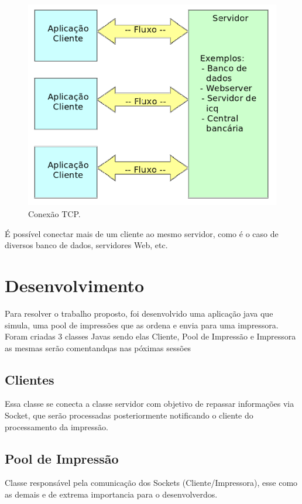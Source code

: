 \documentclass[12pt]{article}
\begin{document}
\begin{figure}[H]
	\centering
	\includegraphics[scale=0.14]{imagens/fluxo.png}
	\caption{Conexão TCP.}
	\label{fluxotcp}
\end{figure} 
É possível conectar mais de um cliente ao mesmo servidor, como é o caso de diversos banco de dados, servidores Web, etc.

\section{Desenvolvimento}
Para resolver o trabalho proposto, foi desenvolvido uma aplicação java que simula, uma pool de impressões que as ordena e envia para uma impressora.
	Foram criadas 3 classes Javas sendo elas Cliente, Pool de Impressão e Impressora as mesmas serão comentandqas nas póximas sessões
	
\subsection{Clientes}
	Essa classe  se conecta a classe servidor com objetivo de repassar informações via Socket, que serão processadas posteriormente notificando o cliente do processamento da impressão.
	



\subsection{Pool de Impressão}\label{pool}
  Classe responsável pela comunicação dos Sockets (Cliente/Impressora), esse como as demais e de extrema importancia para o desenvolverdos.
\end{document}
